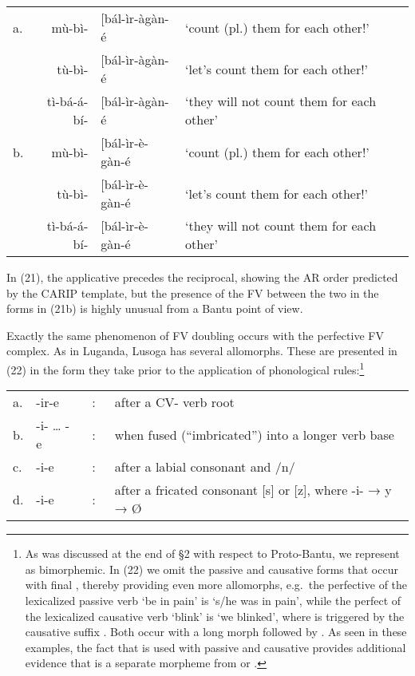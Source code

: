 \documentclass[output=paper,
modfonts
]{LSP/langsci}
\begin{document}
\ea\begin{tabularx}{\linewidth}[t]{@{}lr@{}ll>{\raggedright\arraybackslash}X@{}}
a. & mù-bì- & {[}bál-ìr-àgàn-é & `count (pl.) them for each other!'\\
 & tù-bì- & {[}bál-ìr-àgàn-é & `let's count them for each other!'\\
 & tì-bá-á-bí- & {[}bál-ìr-àgàn-é & `they will not count them for each other'\\
b. & mù-bì- & {[}bál-ìr-è-gàn-é & `count (pl.) them for each other!'\\
 & tù-bì- & {[}bál-ìr-è-gàn-é & `let's count them for each other!'\\
 & tì-bá-á-bí- & {[}bál-ìr-è-gàn-é & `they will not count them for each other'\\
\end{tabularx}
\z

\noindent In (21), the applicative  precedes the reciprocal, showing
the AR order predicted by the CARIP template, but the presence of the FV
between the two in the forms in (21b) is highly unusual from a Bantu
point of view.

Exactly the same phenomenon of FV doubling occurs with the perfective
 FV complex. As in Luganda, Lusoga  has several
allomorphs. These are presented in (22) in the form they take prior to
the application of phonological rules:\footnote{As was discussed at the
  end of §2 with respect to Proto-Bantu, we represent  as
  bimorphemic. In (22) we omit the passive and causative forms that
  occur with final , thereby providing even more allomorphs,
  e.g.\ the perfective of the lexicalized passive verb 
  `be in pain' is \form{tù-{[}lùm-íír-w-à} `s/he was in pain', while the
  perfect of the lexicalized causative verb  `blink' is
  \form{tù-{[}tèm-ííz-à} `we blinked', where  is triggered
  by the causative suffix . Both occur with a long 
  morph followed by . As seen in these examples, the fact that
   is used with passive  and causative 
  provides additional evidence that  is a separate morpheme
  from  or .}

\ea\begin{tabular}[t]{@{}ll@{}l@{}l}
a. & -ir-e & {\ :\ } & after a CV- verb root\\
b. & -i- \dots{} -e & {\ :\ } & when fused (``imbricated'') into a longer verb base\\
c. & -i-e & {\ :\ } & after a labial consonant and /n/\\
d. & -i-e & {\ :\ } & after a fricated consonant {[}s{]} or {[}z{]}, where -i- → y → Ø
\end{tabular}
\z
\end{document}
